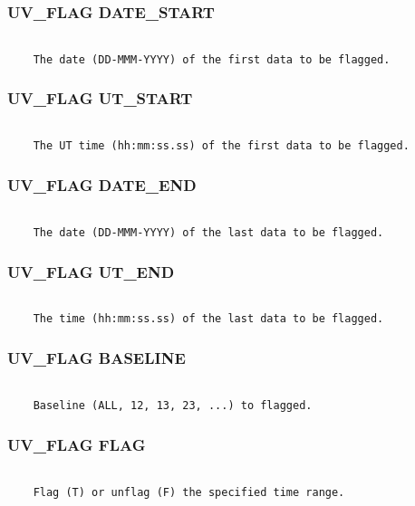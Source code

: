 \subsubsection{UV\_FLAG DATE\_START}
\begin{verbatim}

    The date (DD-MMM-YYYY) of the first data to be flagged.

\end{verbatim}
\subsubsection{UV\_FLAG UT\_START}
\begin{verbatim}

    The UT time (hh:mm:ss.ss) of the first data to be flagged.

\end{verbatim}
\subsubsection{UV\_FLAG DATE\_END}
\begin{verbatim}

    The date (DD-MMM-YYYY) of the last data to be flagged.

\end{verbatim}
\subsubsection{UV\_FLAG UT\_END}
\begin{verbatim}

    The time (hh:mm:ss.ss) of the last data to be flagged.

\end{verbatim}
\subsubsection{UV\_FLAG BASELINE}
\begin{verbatim}

    Baseline (ALL, 12, 13, 23, ...) to flagged.

\end{verbatim}
\subsubsection{UV\_FLAG FLAG}
\begin{verbatim}

    Flag (T) or unflag (F) the specified time range.

\end{verbatim}
